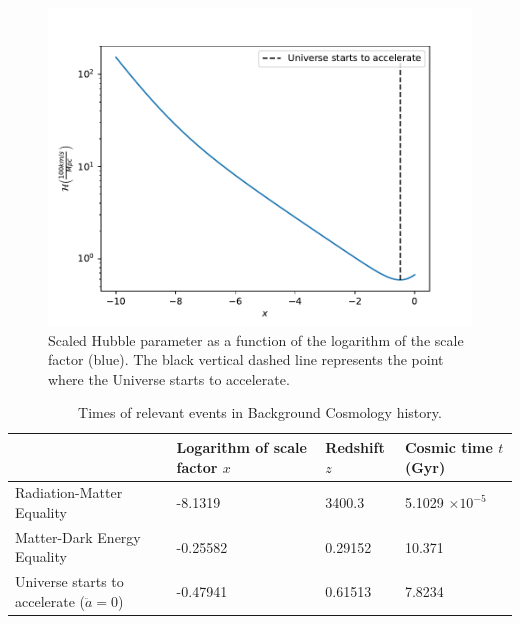 \documentclass{aa}
\begin{document}
\begin{figure}[ht]
\centering
\includegraphics[width=\hsize]{figures/Hp.pdf}
  \caption{Scaled Hubble parameter as a function of the logarithm of the scale factor (blue). The black vertical dashed line represents the point where the Universe starts to accelerate.}
     \label{fig:Hp}
\end{figure}

\begin{table}[ht]
\caption{Times of relevant events in Background Cosmology history.}             
\label{table:times}      
\centering          
\begin{tabular}{l l l l}     %
\hline\hline       
& Logarithm of scale factor $x$      & Redshift $z$     & Cosmic time $t$ (Gyr)\\ 
\hline                    
Radiation-Matter Equality   & -8.1319  & 3400.3  & 5.1029 $\times 10^{-5}$ \\
Matter-Dark Energy Equality & -0.25582 & 0.29152 & 10.371                 \\
Universe starts to accelerate ($\ddot a = 0$)               & -0.47941 & 0.61513 & 7.8234\\ 
\hline                  
\end{tabular}
\end{table}
\end{document}
